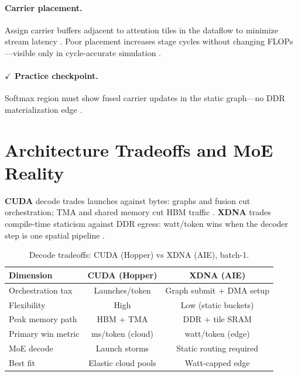 \paragraph{Carrier placement.}
Assign carrier buffers adjacent to attention tiles in the dataflow to minimize stream latency \citep{amd2024xdna,patel2025llminference,chen2020compilerbasedhardw}.
Poor placement increases stage cycles without changing FLOPs---visible only in cycle-accurate simulation \citep{yirage2026,amd2024aie}.

\paragraph{$\checkmark$ Practice checkpoint.}
Softmax region must show fused carrier updates in the static graph---no DDR materialization edge \citep{dao2022flashattention,yirage2026}.

\section{Architecture Tradeoffs and MoE Reality}
\label{sec:ch05_architecture_tradeoffs}

\textbf{CUDA} decode trades launches against bytes: graphs and fusion cut orchestration; TMA and shared memory cut HBM traffic \citep{nvidia2024cudagraphs,taxbreak2026,semianalysis2024tma}.
\textbf{XDNA} trades compile-time staticism against DDR egress: watt/token wins when the decoder step is one spatial pipeline \citep{amd2024xdna,amd2024aie,memoryfloor2026}.

\begin{table}[t]
\centering
\caption{Decode tradeoffs: CUDA (Hopper) vs XDNA (AIE), batch-1.}
\label{tab:cuda_xdna_tradeoffs}
\begin{tabular}{lcc}
\toprule
\textbf{Dimension} & \textbf{CUDA (Hopper)} & \textbf{XDNA (AIE)} \\
\midrule
Orchestration tax & Launches/token & Graph submit + DMA setup \\
Flexibility & High & Low (static buckets) \\
Peak memory path & HBM + TMA & DDR + tile SRAM \\
Primary win metric & ms/token (cloud) & watt/token (edge) \\
MoE decode & Launch storms & Static routing required \\
Best fit & Elastic cloud pools & Watt-capped edge \\
\bottomrule
\end{tabular}
\end{table}

